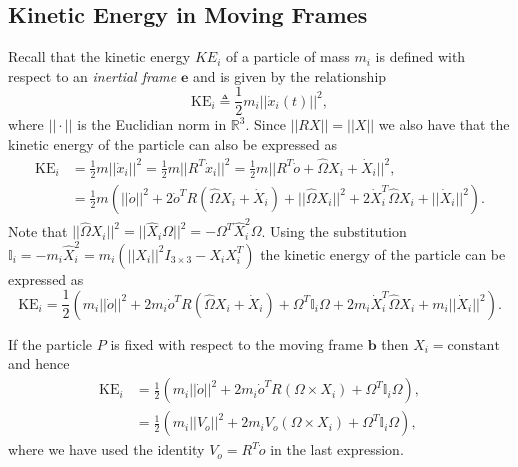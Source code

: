 \documentclass[graybox,envcountchap,sectrefs]{svmonoMuga}
\begin{document}
\subsection{Kinetic Energy in Moving Frames}\label{Secn:KineticEnergyMF}
Recall that the kinetic energy $KE_i$ of a particle of mass $m_i$ is defined with respect to an \textit{inertial frame} $\mathbf{e}$ and is given by the relationship
\begin{equation*}
\mathrm{KE}_i \triangleq \frac{1}{2}m_i ||\dot{x}_i(t)||^2,
\end{equation*}
where $||\cdot||$ is the Euclidian norm in $\mathbb{R}^3$. 
Since $||R X||=||X||$ we also have that the kinetic energy of the particle can also be expressed as 
\begin{align*}
\mathrm{KE}_i&=\frac{1}{2}m ||\dot{x}_i||^2=\frac{1}{2}m ||R^T \dot{x}_i||^2=\frac{1}{2}m ||R^T\dot{o}+\widehat{\Omega} X_i+\dot{X}_i||^2,\\
&=\frac{1}{2}m \left( ||\dot{o}||^2+2\dot{o}^TR(\widehat{\Omega} X_i+\dot{X}_i)+||\widehat{\Omega} X_i||^2+2\dot{X}_i^T\widehat{\Omega}X_i+||\dot{X}_i||^2\right).
\end{align*}
Note that $||\widehat{\Omega}X_i||^2=||\widehat{X}_i\Omega||^2=-\Omega^T\widehat{X}_i^2\Omega$. Using the substitution $\mathbb{I}_i=-m_i\widehat{X}_i^2=m_i(||X_i||^2I_{3\times 3}-X_iX_i^T)$ the kinetic energy of the particle can be expressed as
\begin{equation}\label{eq:KineticEnergyOfaParticleMoving}
\mathrm{KE}_i=\frac{1}{2}\left( m_i||\dot{o}||^2+2m_i\dot{o}^TR(\widehat{\Omega} X_i+\dot{X}_i)+\Omega^T\mathbb{I}_i\Omega+2m_i\dot{X}_i^T\widehat{\Omega}X_i+m_i||\dot{X}_i||^2\right).
\end{equation}
\begin{svgraybox}
If the particle $P$ is fixed with respect to the moving frame $\mathbf{b}$ then ${X}_i=\mathrm{constant}$ and hence
\begin{align}
\mathrm{KE}_i&=\frac{1}{2} \left( m_i||\dot{o}||^2+2m_i\dot{o}^TR({\Omega} \times X_i)+\Omega^T\mathbb{I}_i\Omega
\right),\nonumber\\
&=\frac{1}{2} \left( m_i||V_{o}||^2+2m_iV_o({\Omega} \times X_i)+\Omega^T\mathbb{I}_i\Omega
\right),\label{eq:KineticEnergyOfaParticleFixedInRotFrame}
\end{align}
where we have used the identity $V_o=R^T\dot{o}$ in the last expression.
\end{svgraybox}



\end{document}
